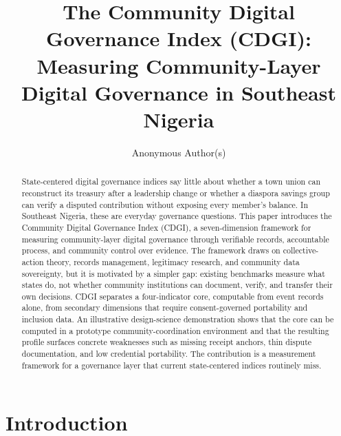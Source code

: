 \documentclass[sigconf,anonymous]{acmart}
\begin{document}
\title{The Community Digital Governance Index (CDGI): Measuring Community-Layer Digital Governance in Southeast Nigeria}

\author{Anonymous Author(s)}

\begin{abstract}
State-centered digital governance indices say little about whether a town union can reconstruct its treasury after a leadership change or whether a diaspora savings group can verify a disputed contribution without exposing every member's balance. In Southeast Nigeria, these are everyday governance questions. This paper introduces the Community Digital Governance Index (CDGI), a seven-dimension framework for measuring community-layer digital governance through verifiable records, accountable process, and community control over evidence. The framework draws on collective-action theory, records management, legitimacy research, and community data sovereignty, but it is motivated by a simpler gap: existing benchmarks measure what states do, not whether community institutions can document, verify, and transfer their own decisions. CDGI separates a four-indicator core, computable from event records alone, from secondary dimensions that require consent-governed portability and inclusion data. An illustrative design-science demonstration shows that the core can be computed in a prototype community-coordination environment and that the resulting profile surfaces concrete weaknesses such as missing receipt anchors, thin dispute documentation, and low credential portability. The contribution is a measurement framework for a governance layer that current state-centered indices routinely miss.
\end{abstract}



\maketitle

\section{Introduction}
\end{document}
